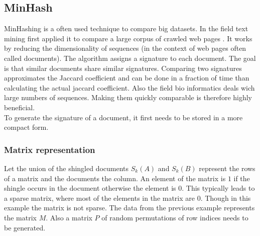 \subsection{MinHash}
\label{ssec:minhash}

MinHashing is a often used technique to compare big datasets. In the field text mining \citeauthor{minhash} first applied it to compare a large corpus of crawled web pages \cite{minhash}. It works by reducing the dimensionality of sequences (in the context of web pages often called documents). The algorithm assigns a signature to each document. The goal is that similar documents share similar signatures. Comparing two signatures approximates the Jaccard coefficient and can be done in a fraction of time than calculating the actual jaccard coefficient. Also the field bio informatics deals wich large numbers of sequences. Making them quickly comparable is therefore highly beneficial. \\

To generate the signature of a document, it first needs to be stored in a more compact form.

\subsubsection{Matrix representation}

Let the union of the shingled documents $ S_k(A) $ and $ S_k(B) $ represent the rows of a matrix and the documents the column. An element of the matrix is $ 1 $ if the shingle occurs in the document otherwise the element is $ 0 $. This typically leads to a sparse matrix, where most of the elements in the matrix are $ 0 $. Though in this example the matrix is not sparse. The data from the previous example represents the matrix $ M $. Also a matrix $ P $ of random permutations of row indices needs to be generated.\\

\newpage

